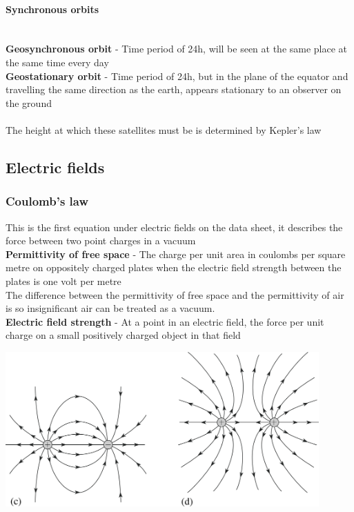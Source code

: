 \documentclass[12pt]{article}
\begin{document}
\paragraph{Synchronous orbits}
$ $\\
\textbf{Geosynchronous orbit} - Time period of 24h, will be seen at the same place at the same time every day\\ 
\textbf{Geostationary orbit} - Time period of 24h, but in the plane of the equator and travelling the same direction as the earth, appears stationary to an observer on the ground\\
\\
The height at which these satellites must be is determined by Kepler's law
\subsection{Electric fields}
\subsubsection{Coulomb's law}
This is the first equation under electric fields on the data sheet, it describes the force between two point charges in a vacuum\\
\textbf{Permittivity of free space} - The charge per unit area in coulombs per square metre on oppositely charged plates when the electric field strength between the plates is one volt per metre\\
The difference between the permittivity of free space and the permittivity of air is so insignificant air can be treated as a vacuum.\\
\textbf{Electric field strength} - At a point in an electric field, the force per unit charge on a small positively charged object in that field
\begin{center}
\includegraphics[width=12cm]{field_lines.png} 
\end{center}
\end{document}
